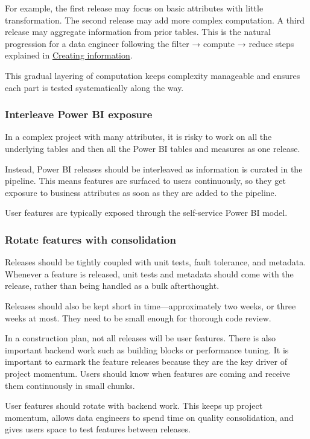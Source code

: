 \documentclass[10pt,openany,10pt]{book}
\begin{document}
For example, the first release may focus on basic attributes with little
transformation. The second release may add more complex computation. A
third release may aggregate information from prior tables. This is the
natural progression for a data engineer following the filter → compute →
reduce steps explained in
\href{/docs/modelling-reality/creating-information/}{Creating
information}.

This gradual layering of computation keeps complexity manageable and
ensures each part is tested systematically along the way.

\subsubsection{Interleave Power BI
exposure}\label{interleave-power-bi-exposure}

In a complex project with many attributes, it is risky to work on all
the underlying tables and then all the Power BI tables and measures as
one release.

Instead, Power BI releases should be interleaved as information is
curated in the pipeline. This means features are surfaced to users
continuously, so they get exposure to business attributes as soon as
they are added to the pipeline.

User features are typically exposed through the self-service Power BI
model.

\subsubsection{Rotate features with
consolidation}\label{rotate-features-with-consolidation-1}

Releases should be tightly coupled with unit tests, fault tolerance, and
metadata. Whenever a feature is released, unit tests and metadata should
come with the release, rather than being handled as a bulk afterthought.

Releases should also be kept short in time---approximately two weeks, or
three weeks at most. They need to be small enough for thorough code
review.

In a construction plan, not all releases will be user features. There is
also important backend work such as building blocks or performance
tuning. It is important to earmark the feature releases because they are
the key driver of project momentum. Users should know when features are
coming and receive them continuously in small chunks.

User features should rotate with backend work. This keeps up project
momentum, allows data engineers to spend time on quality consolidation,
and gives users space to test features between releases.
\end{document}
